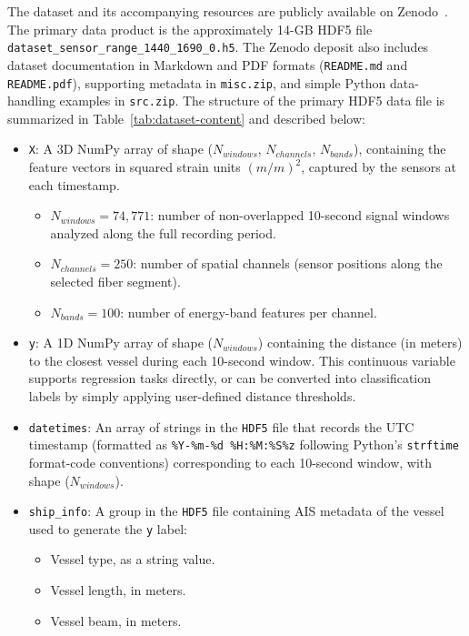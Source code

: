 \documentclass[11pt]{article}
\begin{document}
The dataset and its accompanying resources are publicly available on Zenodo~\cite{ramirez2024dasvesseldataset}. The primary data product is the approximately 14-GB HDF5 file \texttt{dataset\_sensor\_range\_1440\_1690\_0.h5}. The Zenodo deposit also includes dataset documentation in Markdown and PDF formats (\texttt{README.md} and \texttt{README.pdf}), supporting metadata in \texttt{misc.zip}, and simple Python data-handling examples in \texttt{src.zip}. The structure of the primary HDF5 data file is summarized in Table~\ref{tab:dataset-content} and described below:
\begin{itemize}
  \item \texttt{X}: A 3D NumPy array of shape {($N_{windows}$, $N_{channels}$, $N_{bands}$)}, containing the feature vectors in squared strain units $(m/m)^2$, captured by the sensors at each timestamp.
  \begin{itemize}
    \item \textbf{{$N_{windows}=74{,}771$}}: number of non-overlapped 10-second signal windows analyzed along the full recording period.
    \item \textbf{{$N_{channels}=250$}}: number of spatial channels (sensor positions along the selected fiber segment).
    \item \textbf{{$N_{bands}=100$}}: number of energy-band features per channel.
  \end{itemize}

  \item \texttt{y}: A 1D NumPy array of shape {($N_{windows}$)} containing the distance (in meters) to the closest vessel during each 10-second window. This continuous variable supports regression tasks directly, or can be converted into classification labels by simply applying user-defined distance thresholds.

  \item \texttt{datetimes}: An array of strings in the \texttt{HDF5} file that records the UTC timestamp (formatted as \texttt{\%Y-\%m-\%d \%H:\%M:\%S\%z} following Python’s \texttt{strftime} format-code conventions) corresponding to each 10-second window, with shape {($N_{windows}$)}.

  \item \texttt{ship\_info}: A group in the \texttt{HDF5} file containing AIS metadata of the vessel used to generate the \texttt{y} label:
        \begin{itemize}
          \item Vessel type, as a string value.
          \item Vessel length, in meters.
          \item Vessel beam, in meters.
        \end{itemize}
\end{itemize}
\end{document}
